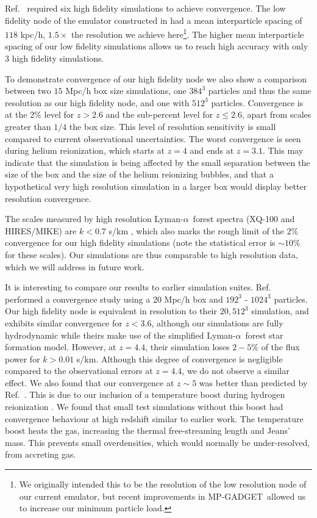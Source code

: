 \documentclass[a4paper,11pt]{article}
\newcommand{\Lya}{Lyman-$\alpha$}
\newcommand{\mpgadget}{{\small MP-GADGET}}
\begin{document}
Ref.~\cite{Fernandez:2022} required six high fidelity simulations to achieve convergence. The low fidelity node of the emulator constructed in \cite{Fernandez:2022} had a mean interparticle spacing of $118$ kpc/h, $1.5 \times$ the resolution we achieve here\footnote{We originally intended this to be the resolution of the low resolution node of our current emulator, but recent improvements in \mpgadget~allowed us to increase our minimum particle load.}. The higher mean interparticle spacing of our low fidelity simulations allows us to reach high accuracy with only $3$ high fidelity simulations.

To demonstrate convergence of our high fidelity node we also show a comparison between two $15$ Mpc/h box size simulations, one $384^3$ particles and thus the same resolution as our high fidelity node, and one with $512^3$ particles. Convergence is at the $2\%$ level for $z > 2.6$ and the sub-percent level for $z \leq 2.6$, apart from scales greater than $1/4$ the box size. This level of resolution sensitivity is small compared to current observational uncertainties.
The worst convergence is seen during helium reionization, which starts at $z=4$ and ends at $z=3.1$. This may indicate that the simulation is being affected by the small separation between the size of the box and the size of the helium reionizing bubbles, and that a hypothetical very high resolution simulation in a larger box would display better resolution convergence.

The scales measured by high resolution \Lya~forest spectra (XQ-100 and HIRES/MIKE) are $ k < 0.7$ s/km \cite{Irsic:2017}, which also marks the rough limit of the $2\%$ convergence for our high fidelity simulations (note the statistical error is $\sim 10\%$ for these scales). Our simulations are thus comparable to high resolution data, which we will address in future work.

It is interesting to compare our results to earlier simulation suites. Ref.~\cite{Borde:2014} performed a convergence study using a $20$ Mpc/h box and $192^3$ - $1024^3$ particles. Our high fidelity node is equivalent in resolution to their $20, 512^3$ simulation, and exhibits similar convergence for $z < 3.6$, although our simulations are fully hydrodynamic while theirs make use of the simplified \Lya~forest star formation model. However, at $z=4.4$, their simulation loses $2-5\%$ of the flux power for $k > 0.01$ s/km. Although this degree of convergence is negligible compared to the observational errors at $z=4.4$, we do not observe a similar effect.
We also found that our convergence at $z \sim 5$ was better than predicted by Ref.~\cite{2009MNRAS.398L..26B, Bolton:2017}. This is due to our inclusion of a temperature boost during hydrogen reionization \cite{DAloisio:2019}. We found that small test simulations without this boost had convergence behaviour at high redshift similar to earlier work. The temperature boost heats the gas, increasing the thermal free-streaming length and Jeans' mass. This prevents small overdensities, which would normally be under-resolved, from accreting gas.
\end{document}
